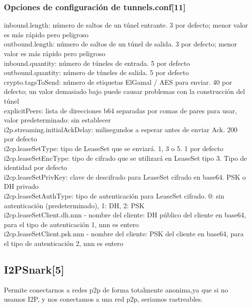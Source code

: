 \documentclass[12]{article}
\begin{document}
\subsubsection{Opciones de configuración de tunnels.conf[11]}
inbound.length: número de saltos de un túnel entrante. 3 por defecto; menor valor es más rápido pero peligroso
\\

outbound.length: número de saltos de un túnel de salida. 3 por defecto; menor valor es más rápido pero peligroso
\\

inbound.quantity: número de túneles de entrada. 5 por defecto
\\

outbound.quantity: número de túneles de salida. 5 por defecto
\\

crypto.tagsToSend: número de etiquetas ElGamal / AES para enviar. 40 por defecto; un valor demasiado bajo puede causar problemas con la construcción del túnel
\\

explicitPeers: lista de direcciones b64 separadas por comas de pares para usar, valor predeterminado: sin establecer
\\

i2p.streaming.initialAckDelay: milisegundos a esperar antes de enviar Ack. 200 por defecto
\\

i2cp.leaseSetType: tipo de LeaseSet que se enviará. 1, 3 o 5. 1 por defecto
\\

i2cp.leaseSetEncType: tipo de cifrado que se utilizará en LeaseSet tipo 3. Tipo de identidad por defecto
\\

i2cp.leaseSetPrivKey: clave de descifrado para LeaseSet cifrado en base64. PSK o DH privado
\\

i2cp.leaseSetAuthType: tipo de autenticación para LeaseSet cifrado. 0: sin autenticación (predeterminado), 1: DH, 2: PSK
\\

i2cp.leaseSetClient.dh.nnn - nombre del cliente: DH público del cliente en base64, para el tipo de autenticación 1, nnn es entero
\\

i2cp.leaseSetClient.psk.nnn - nombre del cliente: PSK del cliente en base64, para el tipo de autenticación 2, nnn es entero 
\subsection{I2PSnark[5]}
Permite conectarnos a redes p2p de forma totalmente anonima,ya que si no usamos I2P, y nos conectamos a una red p2p, seriamos rastreables.
\\
\end{document}
